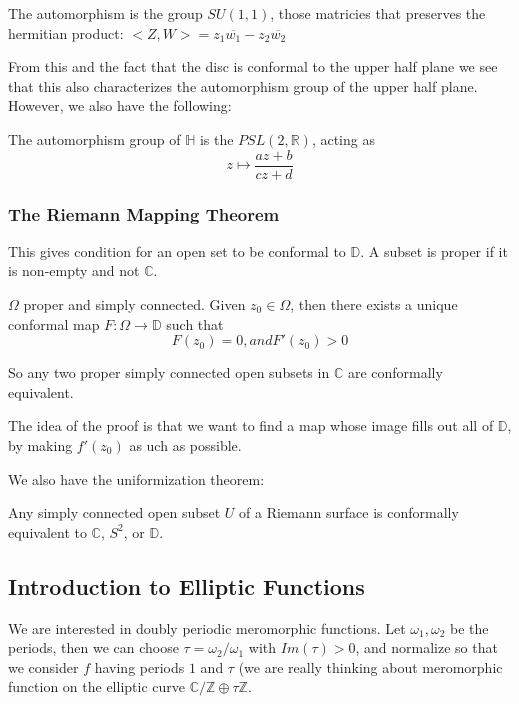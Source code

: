 \documentclass[main.tex]{subfiles}
\begin{document}
The automorphism is the group $SU(1,1)$, those matricies that preserves the hermitian product:
$<Z, W> = z_1 \overline{w_1} - z_2 \overline{w_2}$

From this and the fact that the disc is conformal to the upper half plane we see that this also characterizes the automorphism group of the upper half plane. However, we also have the following:

\begin{theorem}
The automorphism group of $\mathbb{H}$ is the $PSL(2, \mathbb{R})$, acting as 
$$
z \mapsto \frac{az +b}{cz + d}
$$
\end{theorem}

\subsubsection{The Riemann Mapping Theorem}
This gives condition for an open set to be conformal to $\mathbb{D}$. A subset is proper if it is non-empty and not $\mathbb{C}$.

\begin{theorem}
$\Omega$ proper and simply connected. Given $z_0 \in \Omega$, then there exists a unique conformal map $F: \Omega \rightarrow \mathbb{D}$ such that 
$$
F(z_0) = 0, and F'(z_0) > 0
$$
\end{theorem}
So any two proper simply connected open subsets in $\mathbb{C}$ are conformally equivalent.

The idea of the proof is that we want to find a map whose image fills out all of $\mathbb{D}$, by making $f'(z_0)$ as uch as possible.

We also have the uniformization theorem:

\begin{theorem}
Any simply connected open subset $U$ of a Riemann surface is conformally equivalent to $\mathbb{C}$, $S^2$, or $\mathbb{D}$.
\end{theorem}

\subsection{Introduction to Elliptic Functions}

We are interested in doubly periodic meromorphic functions. Let $\omega_1, \omega_2$ be the periods, then we can choose $\tau = \omega_2/\omega_1$ with $Im(\tau)> 0$, and normalize so that we consider $f$ having periods $1$ and $\tau$ (we are really thinking about meromorphic function on the elliptic curve $\mathbb{C}/\mathbb{Z} \oplus \tau \mathbb{Z}$.
\end{document}
